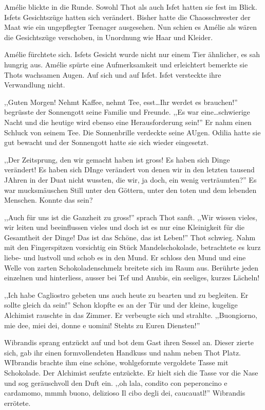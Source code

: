 Amélie blickte in die Runde. Sowohl Thot als auch Isfet hatten sie fest im Blick. Isfets Gesichtszüge hatten sich verändert. Bisher hatte die Chaosschwester der Maat wie ein ungepflegter Teenager ausgesehen. Nun schien es Amélie als wären die Gesichtszüge verschoben, in Unordnung wie Haar und Kleider. 

Amélie fürchtete sich. Isfets Gesicht wurde nicht nur einem Tier ähnlicher, es sah hungrig aus. Amélie spürte eine Aufmerksamkeit und erleichtert bemerkte sie Thots wachsamen Augen. Auf sich und auf Isfet. Isfet versteckte ihre Verwandlung nicht.

,,Guten Morgen! Nehmt Kaffee, nehmt Tee, esst\dots Ihr werdet es brauchen!'' begrüsste der Sonnengott seine Familie und Freunde. ,,Es war eine\dots schwierige Nacht und die heutige wird ebenso eine Herausforderung sein!'' Er nahm einen Schluck von seinem Tee. Die Sonnenbrille verdeckte seine AUgen. Odilia hatte sie gut bewacht und der Sonnengott hatte sie sich wieder eingesetzt.

,,Der Zeitsprung, den wir gemacht haben ist gross! Es haben sich Dinge verändert! Es haben sich DInge verändert von denen wir in den letzten tausend JAhren in der Duat nicht wussten, die wir, ja doch, ein wenig verträumten?'' Es war mucksmäuschen Still unter den Göttern, unter den toten und dem lebenden Menschen. Konnte das sein?

,,Auch für uns ist die Ganzheit zu gross!'' sprach Thot sanft. ,,Wir wissen vieles, wir leiten und beeinflussen vieles und doch ist es nur eine Kleinigkeit für die Gesamtheit der Dinge! Das ist das Schöne, das ist Leben!'' Thot schwieg. Nahm mit den Fingerspitzen vorsichtig ein Stück Mandelschokolade, betrachtete es kurz liebe- und lustvoll und schob es in den Mund. Er schloss den Mund und eine Welle von zarten Schokoladenschmelz  breitete sich im Raum aus. Berührte jeden einzelnen und hinterliess, ausser bei Tef und Anubis, ein seeliges, kurzes Lächeln!

,,Ich habe Cagliostro gebeten uns auch heute zu bearten und zu begleiten. Er sollte gleich da sein!'' Schon klopfte es an der Tür und der kleine, kugelige Alchimist rauschte in das Zimmer. Er verbeugte sich und strahlte. ,,Buongiorno, mie dee, miei dei, donne e uomini! Stehts zu Euren Diensten!'' 

Wibrandis sprang entzückt auf und bot dem Gast ihren Sessel an. Dieser zierte sich, gab ihr einen formvollendeten Handkuss und nahm neben Thot Platz. WIbrandis brachte ihm eine schöne, wohlgeformte vergoldete Tasse mit Schokolade. Der Alchimist seufzte entzückte. Er hielt sich die Tasse vor die Nase und sog geräuschvoll den Duft ein. ,,oh lala, condito con peperoncino e cardamomo, mmmh buono, delizioso Il cibo degli dei, caucauatl!'' Wibrandis errötete.

